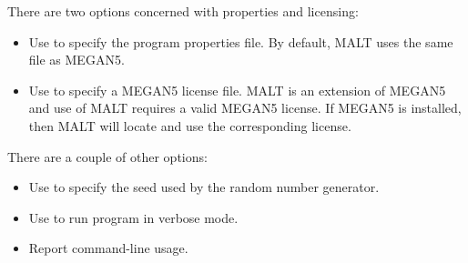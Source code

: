 \documentclass[11pt]{article}
\newcommand\MALT{{\sf MALT}\xspace}
\begin{document}
There are two options concerned with properties and licensing:
\begin{itemize}
\setlength{\itemindent}{30pt}
\item[\itt{--propertiesFile}] Use to specify the program properties file. By default, \MALT uses the same file as MEGAN5.
\item[\itt{licenseFile}] Use to specify a MEGAN5 license file. \MALT is an extension of MEGAN5 and use of \MALT requires a valid MEGAN5 license.
If MEGAN5 is installed, then \MALT will locate and use the corresponding license.
\end{itemize}


There are a couple of other options:
\begin{itemize}
\setlength{\itemindent}{30pt}
\item[\itt{--random}] Use to specify the seed used by the random number generator.
\item[\itt{--verbose}] Use to run program in verbose mode.
\item[\itt{--help}] Report command-line usage.
\end{itemize}
\end{document}
